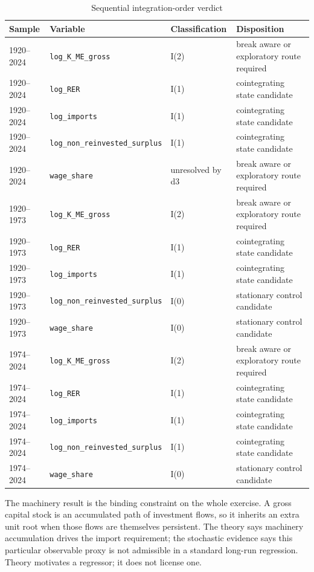 \documentclass[11pt]{article}
\begin{document}
\begin{table}[H]
\centering
\caption{Sequential integration-order verdict}
\label{tab:integration}
\begin{tabular}{p{2.0cm}p{5.7cm}p{2.4cm}p{4.0cm}}
\toprule
\textbf{Sample} & \textbf{Variable} & \textbf{Classification} & \textbf{Disposition} \\
\midrule
1920--2024 & \texttt{log\_K\_ME\_gross} & I(2) & break aware or exploratory route required \\
1920--2024 & \texttt{log\_RER} & I(1) & cointegrating state candidate \\
1920--2024 & \texttt{log\_imports} & I(1) & cointegrating state candidate \\
1920--2024 & \texttt{log\_non\_reinvested\_surplus} & I(1) & cointegrating state candidate \\
1920--2024 & \texttt{wage\_share} & unresolved by d3 & break aware or exploratory route required \\
1920--1973 & \texttt{log\_K\_ME\_gross} & I(2) & break aware or exploratory route required \\
1920--1973 & \texttt{log\_RER} & I(1) & cointegrating state candidate \\
1920--1973 & \texttt{log\_imports} & I(1) & cointegrating state candidate \\
1920--1973 & \texttt{log\_non\_reinvested\_surplus} & I(0) & stationary control candidate \\
1920--1973 & \texttt{wage\_share} & I(0) & stationary control candidate \\
1974--2024 & \texttt{log\_K\_ME\_gross} & I(2) & break aware or exploratory route required \\
1974--2024 & \texttt{log\_RER} & I(1) & cointegrating state candidate \\
1974--2024 & \texttt{log\_imports} & I(1) & cointegrating state candidate \\
1974--2024 & \texttt{log\_non\_reinvested\_surplus} & I(1) & cointegrating state candidate \\
1974--2024 & \texttt{wage\_share} & I(0) & stationary control candidate \\
\bottomrule
\end{tabular}
\end{table}

The machinery result is the binding constraint on the whole exercise. A gross capital stock is an accumulated path of investment flows, so it inherits an extra unit root when those flows are themselves persistent. The theory says machinery accumulation drives the import requirement; the stochastic evidence says this particular observable proxy is not admissible in a standard long-run regression. Theory motivates a regressor; it does not license one.
\end{document}
